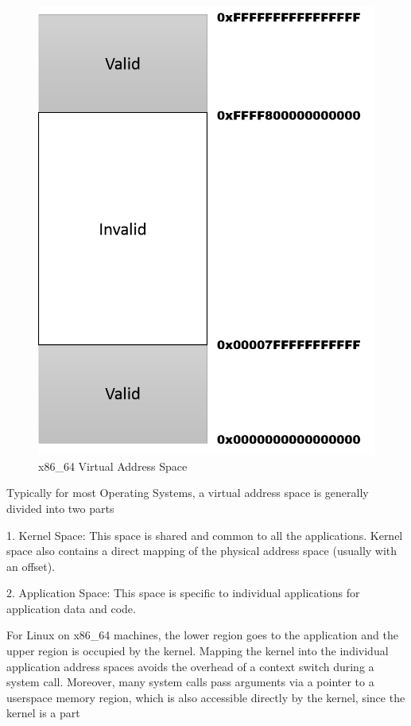 \begin{figure}[H]
\centering
\includegraphics[scale=0.6]{figures/x86_64_VA_space.png}
\caption{x86\_64 Virtual Address Space}
\label{fig:x86_memspace}
\end{figure}

Typically for most Operating Systems, a virtual address space is generally divided into two parts 

1. Kernel Space: This space is shared and common to all the applications. Kernel space also contains a direct mapping of the physical address space (usually with an offset). 

2. Application Space: This space is specific to individual applications for application data and code. 

For Linux on x86\_64 machines, the lower region goes to the application and the upper region is occupied by the kernel. Mapping the kernel into the individual application address spaces avoids the overhead of a context switch during a system call. Moreover, many system calls pass arguments via a pointer to a userspace memory region, which is also accessible directly by the kernel, since the kernel is a part 


